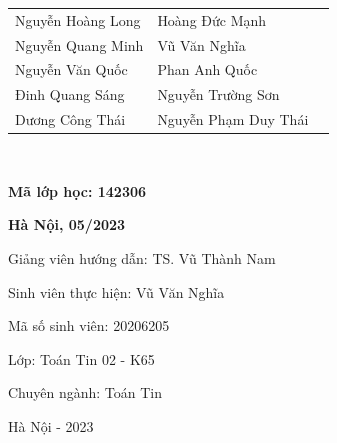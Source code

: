 \documentclass{article}
\begin{document}
\begin{titlepage}
	\hspace{3cm}
	\begin{minipage}{0.7\textwidth}
		\begin{tabular}{l l l}
			Nguyễn Hoàng Long & Hoàng Đức Mạnh       \\
			Nguyễn Quang Minh & Vũ Văn Nghĩa         \\
			Nguyễn Văn Quốc   & Phan Anh Quốc        \\
			Đinh Quang Sáng   & Nguyễn Trường Sơn    \\
			Dương Công Thái   & Nguyễn Phạm Duy Thái \\
		\end{tabular}
	\end{minipage}\\

	\hspace{2.4cm}
	\begin{minipage}{0.8\textwidth}
		\textbf{Mã lớp học: 142306}
	\end{minipage}
	\vspace{0.5cm}
	\begin{center}
		\textbf{Hà Nội, 05/2023}
	\end{center}
\end{titlepage}







Giảng viên hướng dẫn: TS. Vũ Thành Nam

Sinh viên thực hiện: Vũ Văn Nghĩa

Mã số sinh viên: 20206205

Lớp: Toán Tin 02 - K65

Chuyên ngành: Toán Tin

Hà Nội - 2023
\end{document}

